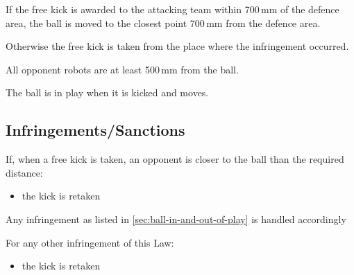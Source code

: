 If the free kick is awarded to the attacking team within 700\,mm of the defence area, the ball is moved to the closest point 700\,mm from the defence area.

Otherwise\added{,} the free kick is taken from the place where the infringement occurred.

All opponent robots are at least 500\,mm from the ball.

The ball is in play when it is kicked and moves.

\subsection{Infringements/Sanctions}
If, when a free kick is taken, an opponent is closer to the ball than the required distance:
\begin{itemize}
\item the kick is retaken
\end{itemize}

Any infringement as listed in \autoref{sec:ball-in-and-out-of-play} is handled accordingly

For any other infringement of this Law:
\begin{itemize}
\item the kick is retaken
\end{itemize}
